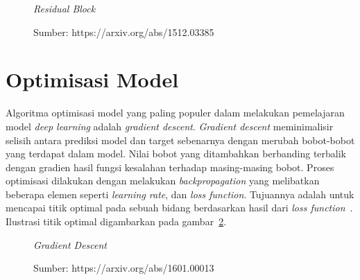\begin{figure}[htbp]
    \begin{center}
    \end{center}
    \vspace{-20pt}
    \captionsetup{labelfont=bf, textfont=bf}
    \caption{\textit{Residual Block}}
    \vspace{-10pt}
    \captionsetup{labelfont=md, textfont=md}
    \caption*{Sumber: https://arxiv.org/abs/1512.03385}
    \label{fig:resblock}
\end{figure}

\section{Optimisasi Model}
\label{sec:2-OptimisasiModel}

Algoritma optimisasi model yang paling populer dalam melakukan pemelajaran model \textit{deep learning}
adalah \textit{gradient descent}. \textit{Gradient descent} meminimalisir selisih antara prediksi
model dan target sebenarnya dengan merubah bobot-bobot yang terdapat dalam model. Nilai bobot yang
ditambahkan berbanding terbalik dengan gradien hasil fungsi kesalahan terhadap masing-masing bobot.
Proses optimisasi dilakukan dengan melakukan \textit{backpropagation} yang
melibatkan beberapa elemen seperti \textit{learning rate},
dan \textit{loss function}. Tujuannya adalah untuk mencapai titik optimal pada sebuah bidang berdasarkan
hasil dari \textit{loss function}~\cite{2016arXiv160100013G}. Ilustrasi titik optimal digambarkan
pada gambar~\ref{fig:gradientdescent}.

\begin{figure}[htbp]
    \begin{center}
    \end{center}
    \vspace{-20pt}
    \captionsetup{labelfont=bf, textfont=bf}
    \caption{\textit{Gradient Descent}}
    \vspace{-10pt}
    \captionsetup{labelfont=md, textfont=md}
    \caption*{Sumber: https://arxiv.org/abs/1601.00013}
    \label{fig:gradientdescent}
\end{figure}

